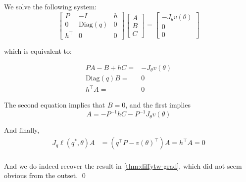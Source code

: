 We solve the following system:
\begin{equation}
\begin{bmatrix}
    P & - I & h\\
    0 & \mathrm{Diag}(q)& 0\\
    h^\top  & 0 & 0
    \end{bmatrix}
\begin{bmatrix}
    A \\
    B \\
    C
    \end{bmatrix} =
\begin{bmatrix}
    - J_\theta v(\theta) \\
    0 \\
    0
    \end{bmatrix}
\end{equation}

which is equivalent to:

\begin{align}
   PA - B + hC =& -J_\theta v(\theta)\\
   \mathrm{Diag}(q)B =& 0\\
   h^\top A =& 0
\end{align}

The second equation implies that $B=0$, and the first implies
\begin{equation}
    A = - P^{-1}hC - P^{-1}J_\theta v(\theta)
\end{equation}

And finally,
\begin{align}
    J_q\ell(q^*,\theta)A &= (q^\top P - v(\theta)^\top )A = h^\top A = 0
\end{align}
\paragraph{}
And we do indeed recover the result in \cref{thm:diffytw-grad}, which did not seem obvious from the outset.
\qed
